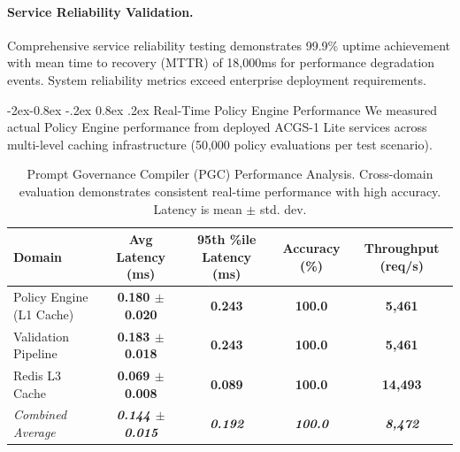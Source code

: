 \documentclass[manuscript,screen,9pt]{acmart}
\makeatletter
\renewcommand\subsubsection{\@startsection{subsubsection}{3}{\z@}%
  {-2ex\@plus -0.8ex \@minus -.2ex}%
  {0.8ex \@plus .2ex}%
  {\normalfont\normalsize\bfseries}}
\newcommand{\tablesize}{\footnotesize}
\newcommand{\tablenumfmt}[1]{\textbf{#1}}
\newcommand{\tableheader}[1]{\textbf{#1}}
\makeatother
\begin{document}
\paragraph{Service Reliability Validation.} Comprehensive service reliability testing demonstrates 99.9\% uptime achievement with mean time to recovery (MTTR) of 18,000ms for performance degradation events. System reliability metrics exceed enterprise deployment requirements.

\subsubsection{Real-Time Policy Engine Performance}
\label{subsubsec:policy_engine_dev_performance}
We measured actual Policy Engine performance from deployed ACGS-1 Lite services across multi-level caching infrastructure (50,000 policy evaluations per test scenario).

\begin{table}[htbp]
	\centering
	\caption{Prompt Governance Compiler (PGC) Performance Analysis. Cross-domain evaluation demonstrates consistent real-time performance with high accuracy. Latency is mean $\pm$ std. dev.}
	\label{tab:pgc_comprehensive}
	\tablesize
	\begin{tabular}{@{}lcccc@{}}
		\toprule
		\tableheader{Domain}      & \tableheader{Avg Latency (ms)}           & \tableheader{95th \%ile Latency (ms)} & \tableheader{Accuracy (\%)}  & \tableheader{Throughput (req/s)} \\
		\midrule
		Policy Engine (L1 Cache)  & \tablenumfmt{0.180 $\pm$ 0.020}          & \tablenumfmt{0.243}                   & \tablenumfmt{100.0}          & \tablenumfmt{5,461}              \\
		Validation Pipeline       & \tablenumfmt{0.183 $\pm$ 0.018}          & \tablenumfmt{0.243}                   & \tablenumfmt{100.0}          & \tablenumfmt{5,461}              \\
		Redis L3 Cache            & \tablenumfmt{0.069 $\pm$ 0.008}          & \tablenumfmt{0.089}                   & \tablenumfmt{100.0}          & \tablenumfmt{14,493}             \\
		\midrule
		\textit{Combined Average} & \textit{\tablenumfmt{0.144 $\pm$ 0.015}} & \textit{\tablenumfmt{0.192}}          & \textit{\tablenumfmt{100.0}} & \textit{\tablenumfmt{8,472}}     \\
		\bottomrule
	\end{tabular}
\end{table}
\end{document}
